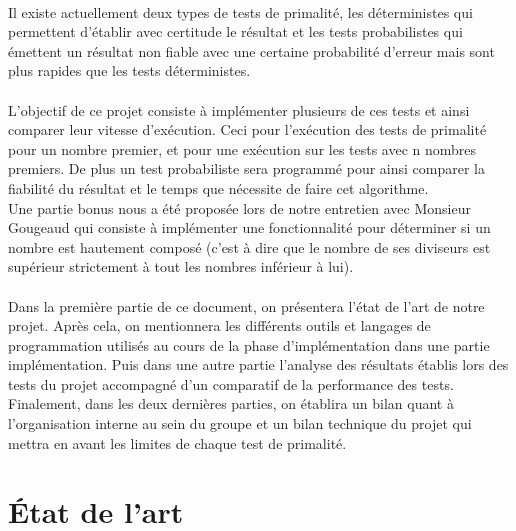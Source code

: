 	\paragraph{}Il existe actuellement deux types de tests de primalité, les déterministes qui permettent d'établir avec certitude le résultat et les tests probabilistes qui émettent un résultat non fiable avec une certaine probabilité d'erreur mais sont plus rapides que les tests déterministes.
	
	\paragraph{}L'objectif de ce projet consiste à implémenter plusieurs de ces tests et ainsi comparer leur vitesse  d'exécution. Ceci pour l'exécution des tests de primalité pour un nombre premier, et pour une exécution sur les tests avec n nombres premiers. De plus un test probabiliste sera programmé pour ainsi comparer la fiabilité du résultat et le temps que nécessite de faire cet algorithme.\\ 
	Une partie bonus nous a été proposée lors de notre entretien avec Monsieur Gougeaud qui consiste à implémenter une fonctionnalité pour déterminer si un nombre est hautement composé (c'est à dire que le nombre de ses diviseurs est supérieur strictement à tout les nombres inférieur à lui). 
	
	\paragraph{}Dans la première partie de ce document, on présentera l'état de l'art de notre projet.
	Après cela, on mentionnera les différents outils et langages de programmation utilisés au cours de la phase d'implémentation dans une partie implémentation. Puis dans une autre partie l'analyse des résultats établis lors des tests du projet accompagné d'un comparatif de la performance des tests.
	Finalement, dans les deux dernières parties, on établira un bilan quant à l'organisation interne au sein du groupe et un bilan technique du projet qui mettra en avant les limites de chaque test de primalité.
	
		
	\section{État de l'art}
